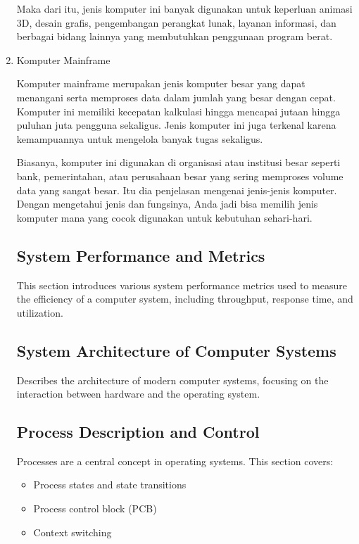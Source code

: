 \documentclass[12pt]{article}
\begin{document}
\begin{enumerate}
    Maka dari itu, jenis komputer ini banyak digunakan untuk keperluan animasi 3D, desain grafis, pengembangan perangkat lunak, layanan informasi, dan berbagai bidang lainnya yang membutuhkan penggunaan program berat. 

    \item Komputer Mainframe

    Komputer mainframe merupakan jenis komputer besar yang dapat menangani serta memproses data dalam jumlah yang besar dengan cepat. Komputer ini memiliki kecepatan kalkulasi hingga mencapai jutaan hingga puluhan juta pengguna sekaligus. Jenis komputer ini juga terkenal karena kemampuannya untuk mengelola banyak tugas sekaligus. 

    Biasanya, komputer ini digunakan di organisasi atau institusi besar seperti bank, pemerintahan, atau perusahaan besar yang sering memproses volume data yang sangat besar. Itu dia penjelasan mengenai jenis-jenis komputer. Dengan mengetahui jenis dan fungsinya, Anda jadi bisa memilih jenis komputer mana yang cocok digunakan untuk kebutuhan sehari-hari.
    

\subsection{System Performance and Metrics}
This section introduces various system performance metrics used to measure the efficiency of a computer system, including throughput, response time, and utilization.

\subsection{System Architecture of Computer Systems}
Describes the architecture of modern computer systems, focusing on the interaction between hardware and the operating system.

\subsection{Process Description and Control}
Processes are a central concept in operating systems. This section covers:
\begin{itemize}
    \item Process states and state transitions
    \item Process control block (PCB)
    \item Context switching
\end{itemize}


\end{enumerate}
\end{document}
